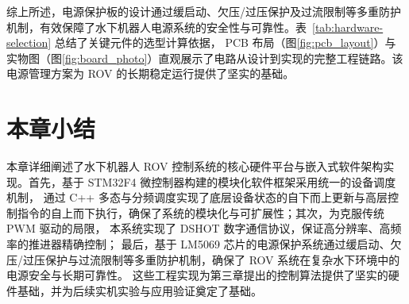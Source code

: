 综上所述，电源保护板的设计通过缓启动、欠压/过压保护及过流限制等多重防护机制，有效保障了水下机器人电源系统的安全性与可靠性。表~\ref{tab:hardware-selection} 总结了关键元件的选型计算依据，
PCB 布局（图\ref{fig:pcb_layout}）与实物图（图\ref{fig:board_photo}）直观展示了电路从设计到实现的完整工程链路。该电源管理方案为 ROV 的长期稳定运行提供了坚实的基础。

\section{本章小结}

本章详细阐述了水下机器人 ROV 控制系统的核心硬件平台与嵌入式软件架构实现。首先，基于 STM32F4 微控制器构建的模块化软件框架采用统一的设备调度机制，
通过 C++ 多态与分频调度实现了底层设备状态的自下而上更新与高层控制指令的自上而下执行，确保了系统的模块化与可扩展性；其次，为克服传统 PWM 驱动的局限，
本系统实现了 DSHOT 数字通信协议，保证高分辨率、高频率的推进器精确控制；
最后，基于 LM5069 芯片的电源保护系统通过缓启动、欠压/过压保护与过流限制等多重防护机制，确保了 ROV 系统在复杂水下环境中的电源安全与长期可靠性。
这些工程实现为第三章提出的控制算法提供了坚实的硬件基础，并为后续实机实验与应用验证奠定了基础。
